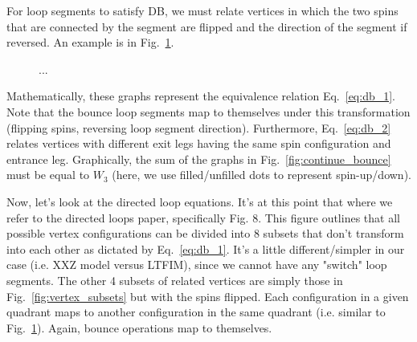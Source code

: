 \documentclass[12pt]{article}
\begin{document}
For loop segments to satisfy DB, we must relate vertices in which the two spins that are connected by the segment are flipped and the direction of the segment if reversed. 
An example is in Fig.~\ref{fig:related_vertices}.

\begin{figure} [!h]
    \centering
\caption{...} \label{fig:related_vertices}
\end{figure}
Mathematically, these graphs represent the equivalence relation Eq.~\ref{eq:db_1}.
Note that the bounce loop segments map to themselves under this transformation (flipping spins, reversing loop segment direction).
Furthermore, Eq.~\ref{eq:db_2} relates vertices with different exit legs having the same spin configuration and entrance leg.
Graphically, the sum of the graphs in Fig.~\ref{fig:continue_bounce} must be equal to $W_3$ (here, we use filled/unfilled dots to represent spin-up/down).

Now, let's look at the directed loop equations. 
It's at this point that where we refer to the directed loops paper, specifically Fig. 8.
This figure outlines that all possible vertex configurations can be divided into 8 subsets that don't transform into each other as dictated by Eq.~\ref{eq:db_1}.
It's a little different/simpler in our case (i.e. XXZ model versus LTFIM), since we cannot have any "switch" loop segments.
The other 4 subsets of related vertices are simply those in Fig.~\ref{fig:vertex_subsets} but with the spins flipped.
Each configuration in a given quadrant maps to another configuration in the same quadrant (i.e. similar to Fig.~\ref{fig:related_vertices}). 
Again, bounce operations map to themselves.
\end{document}

